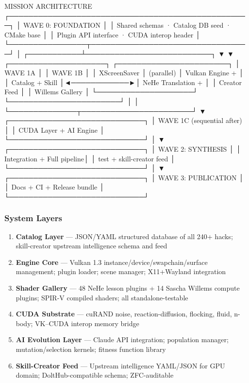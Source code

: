 \documentclass[11pt,letterpaper]{article}
\begin{document}
\begin{asciibox}
                    MISSION ARCHITECTURE
    ┌──────────────────────────────────────────────────┐
    │  WAVE 0: FOUNDATION                              │
    │  Shared schemas · Catalog DB seed · CMake base   │
    │  Plugin API interface · CUDA interop header      │
    └────────────────┬─────────────────────────────────┘
                     │
         ┌───────────┴──────────────────────────┐
         ▼                                      ▼
┌────────────────────┐              ┌───────────────────────┐
│ WAVE 1A            │              │ WAVE 1B               │
│ XScreenSaver       │  (parallel)  │ Vulkan Engine +       │
│ Catalog + Skill    │◄────────────►│ NeHe Translation +    │
│ Creator Feed       │              │ Willems Gallery       │
└────────────────────┘              └───────────────────────┘
         │                                      │
         └──────────────┬───────────────────────┘
                        ▼
           ┌────────────────────────────┐
           │ WAVE 1C (sequential after) │
           │ CUDA Layer + AI Engine     │
           └────────────────────────────┘
                        │
                        ▼
           ┌────────────────────────────┐
           │ WAVE 2: SYNTHESIS          │
           │ Integration + Full pipeline│
           │ test + skill-creator feed  │
           └────────────────────────────┘
                        │
                        ▼
           ┌────────────────────────────┐
           │ WAVE 3: PUBLICATION        │
           │ Docs + CI + Release bundle │
           └────────────────────────────┘
\end{asciibox}

\subsubsection{System Layers}

\begin{enumerate}
\item \textbf{Catalog Layer} --- JSON/YAML structured database of all 240+ hacks; skill-creator upstream intelligence schema and feed
\item \textbf{Engine Core} --- Vulkan 1.3 instance/device/swapchain/surface management; plugin loader; scene manager; X11+Wayland integration
\item \textbf{Shader Gallery} --- 48 NeHe lesson plugins + 14 Sascha Willems compute plugins; SPIR-V compiled shaders; all standalone-testable
\item \textbf{CUDA Substrate} --- cuRAND noise, reaction-diffusion, flocking, fluid, n-body; VK--CUDA interop memory bridge
\item \textbf{AI Evolution Layer} --- Claude API integration; population manager; mutation/selection kernels; fitness function library
\item \textbf{Skill-Creator Feed} --- Upstream intelligence YAML/JSON for GPU domain; DoltHub-compatible schema; ZFC-auditable
\end{enumerate}
\end{document}
